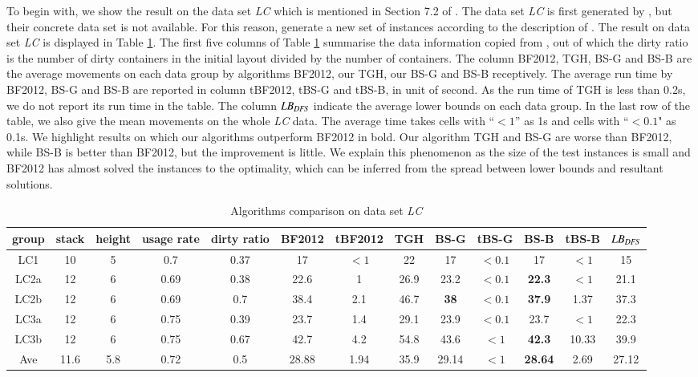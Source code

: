 \documentclass[review,3p,times,authoryear,12pt]{elsarticle}
\begin{document}
To begin with, we show the result on the data set {\em LC} which is mentioned in Section 7.2 of \cite{BF2012}. The data set {\em LC} is first generated by \cite{Lee2009}, but their concrete data set is not available. For this reason, \cite{BF2012} generate a new set of instances according to the description of \cite{Lee2009}. The result on data set {\em LC} is displayed in Table \ref{tab:lc}. The first five columns of Table \ref{tab:lc} summarise the data information copied from \cite{BF2012}, out of which the dirty ratio is the number of dirty containers in the initial layout divided by the number of containers.
The column BF2012, TGH, BS-G and BS-B are the average movements on each data group by algorithms BF2012, our TGH, our BS-G and BS-B receptively. The average run time by BF2012, BS-G and BS-B are reported in column tBF2012, tBS-G and tBS-B, in unit of second. As the run time of TGH is less than 0.2s, we do not report its run time in the table. The column $\id{LB}_\id{DFS}$ indicate the average lower bounds on each data group. In the last row of the table, we also give the mean movements on the whole {\em LC} data. The average time takes cells with ``$<1$''  as 1s and cells with ``$<0.1$" as 0.1s. We highlight results on which our algorithms outperform BF2012 in bold. Our algorithm TGH and BS-G are worse than BF2012, while BS-B is better than BF2012, but the improvement is little. We explain this phenomenon as the size of the test instances is small and BF2012 has almost solved the instances to the optimality, which can be inferred from the spread between lower bounds and resultant solutions.
\begin{table}[htbp]
\begin{footnotesize}

  \caption{\label{tab:lc} Algorithms comparison on data set {\em LC}}
    \begin{tabular}{c|c|c|c|c|c|c|c|c|c|c|c|c}

    \hline
    group & stack & height & usage rate & dirty ratio & BF2012 & tBF2012 & TGH   & BS-G  & tBS-G & BS-B  & tBS-B & $\id{LB}_\id{DFS}$ \\
    \hline
    LC1   & 10   & 5  & 0.7  & 0.37 & 17   & $<1$ & 22   & 17         & $<0.1$ & 17             & $<1$  & 15\\
    LC2a  & 12   & 6  & 0.69 & 0.38 & 22.6 & 1    & 26.9 & 23.2       & $<0.1$ & \textbf{22.3}  & $<1$  & 21.1\\
    LC2b  & 12   & 6  & 0.69 & 0.7  & 38.4 & 2.1  & 46.7 & \textbf{38}& $<0.1$ & \textbf{37.9}  & 1.37  & 37.3\\
    LC3a  & 12   & 6  & 0.75 & 0.39 & 23.7 & 1.4  & 29.1 & 23.9       & $<0.1$ & 23.7           & $<1$  & 22.3\\
    LC3b  & 12   & 6  & 0.75 & 0.67 & 42.7 & 4.2  & 54.8 & 43.6       & $<1$   & \textbf{42.3}  & 10.33 & 39.9\\
    \hline
    Ave   & 11.6 & 5.8& 0.72 & 0.5  & 28.88& 1.94 & 35.9 & 29.14      & $<1$   & \textbf{28.64} & 2.69  & 27.12 \\
    \hline
    \end{tabular}%
\end{footnotesize}
\end{table}%
\end{document}
